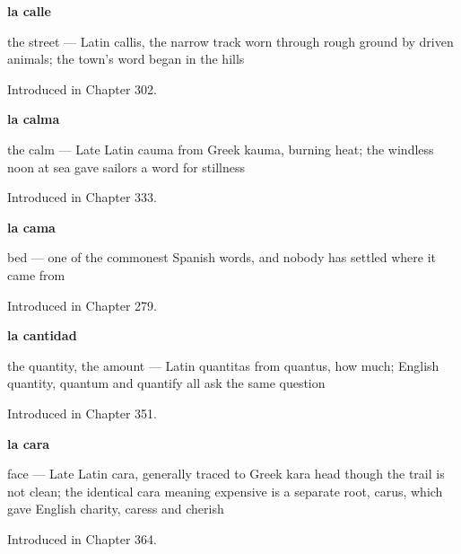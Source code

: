 \noindent\begin{minipage}[t]{\linewidth}
\raggedright
\textbf{la calle}\par
\small the street — Latin callis, the narrow track worn through rough ground by driven animals; the town's word began in the hills\par
\footnotesize Introduced in Chapter 302.
\end{minipage}\par\medskip

\noindent\begin{minipage}[t]{\linewidth}
\raggedright
\textbf{la calma}\par
\small the calm — Late Latin cauma from Greek kauma, burning heat; the windless noon at sea gave sailors a word for stillness\par
\footnotesize Introduced in Chapter 333.
\end{minipage}\par\medskip

\noindent\begin{minipage}[t]{\linewidth}
\raggedright
\textbf{la cama}\par
\small bed — one of the commonest Spanish words, and nobody has settled where it came from\par
\footnotesize Introduced in Chapter 279.
\end{minipage}\par\medskip

\noindent\begin{minipage}[t]{\linewidth}
\raggedright
\textbf{la cantidad}\par
\small the quantity, the amount — Latin quantitas from quantus, how much; English quantity, quantum and quantify all ask the same question\par
\footnotesize Introduced in Chapter 351.
\end{minipage}\par\medskip

\noindent\begin{minipage}[t]{\linewidth}
\raggedright
\textbf{la cara}\par
\small face — Late Latin cara, generally traced to Greek kara head though the trail is not clean; the identical cara meaning expensive is a separate root, carus, which gave English charity, caress and cherish\par
\footnotesize Introduced in Chapter 364.
\end{minipage}\par\medskip

